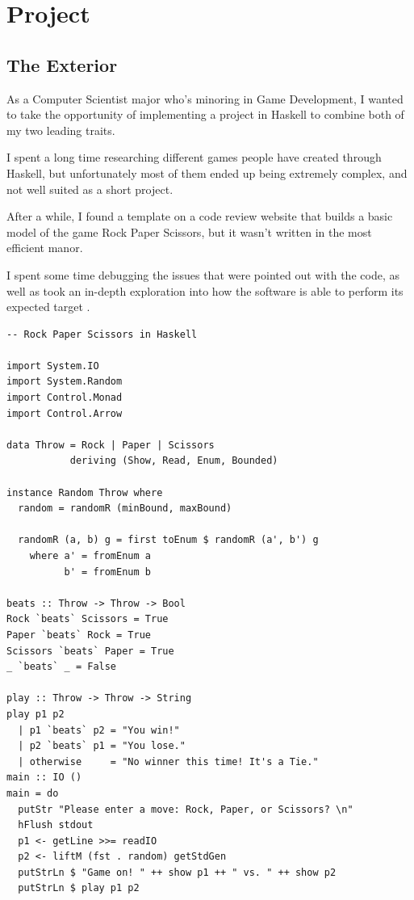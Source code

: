 \documentclass{article}
\begin{document}
\section{Project}

\hspace{\parindent} 
\subsection{The Exterior}
\medskip\medskip
\hspace{\parindent} 

As a Computer Scientist major who's minoring in Game Development, I wanted to take the opportunity of implementing a project in Haskell to combine both of my two leading traits.

\medskip\noindent
I spent a long time researching different games people have created through Haskell, but unfortunately most of them ended up being extremely complex, and not well suited as a short project.

\medskip\noindent
After a while, I found a template on a code review website that builds a basic model of the game Rock Paper Scissors, but it wasn't written in the most efficient manor.

\medskip\noindent
I spent some time debugging the issues that were pointed out with the code, as well as took an in-depth exploration into how the software is able to perform its expected target \cite{HG}.

\begin{lstlisting}
-- Rock Paper Scissors in Haskell 

import System.IO
import System.Random
import Control.Monad
import Control.Arrow

data Throw = Rock | Paper | Scissors
           deriving (Show, Read, Enum, Bounded)

instance Random Throw where
  random = randomR (minBound, maxBound)

  randomR (a, b) g = first toEnum $ randomR (a', b') g
    where a' = fromEnum a
          b' = fromEnum b

beats :: Throw -> Throw -> Bool
Rock `beats` Scissors = True
Paper `beats` Rock = True
Scissors `beats` Paper = True
_ `beats` _ = False

play :: Throw -> Throw -> String
play p1 p2
  | p1 `beats` p2 = "You win!"
  | p2 `beats` p1 = "You lose."
  | otherwise     = "No winner this time! It's a Tie."
main :: IO ()
main = do
  putStr "Please enter a move: Rock, Paper, or Scissors? \n"
  hFlush stdout
  p1 <- getLine >>= readIO
  p2 <- liftM (fst . random) getStdGen
  putStrLn $ "Game on! " ++ show p1 ++ " vs. " ++ show p2
  putStrLn $ play p1 p2
\end{lstlisting}
\end{document}
